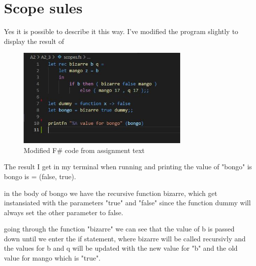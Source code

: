 \section{Scope sules}

Yes it is possible to describe it this way. I've modified the program slightly to display the result
of 
\begin{figure}[H]
    \centering
    \includegraphics[width=0.75\textwidth]{Figures/Scope_rules.JPG}
    \caption{Modified F\# code from assignment text}
\end{figure}

The result I get in my terminal when running and printing the value of "bongo"
is bongo is = (false, true).

in the body of bongo we have the recursive function bizarre, which get
instansiated with the parameters "true" and "false" since the function dummy
will always set the other parameter to false.

going through the function "bizarre" we can see that the value of b is passed down
until we enter the if statement, where bizarre will be called recursivly and the values
for b and q will be updated with the new value for "b" and the old value for mango which is
"true".

\newpage
